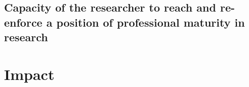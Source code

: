 \documentclass[a4paper,11pt]{article}
\newcommand{\TODO}[1]{{\textcolor{red}{[\textbf{TODO:} #1]}}}
\begin{document}
\subsection{Capacity of the researcher to reach and re-enforce a position of professional maturity in research}
\label{sec:maturity}


%
%
%

\section{Impact}
\label{sec:impact}
\end{document}
